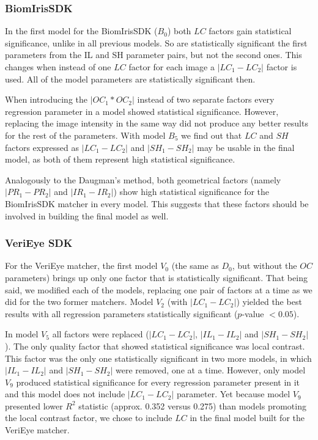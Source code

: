 \documentclass{article}
\begin{document}
\subsubsection{BiomIrisSDK}
In the first model for the BiomIrisSDK ($B_0$) both $LC$ factors gain statistical significance, unlike in all previous models. So are statistically significant the first parameters from the IL and SH parameter pairs, but not the second ones. This changes when instead of one $LC$ factor for each image a $|LC_1 - LC_2|$ factor is used. All of the model parameters are statistically significant then.

When introducing the $|OC_1 * OC_2|$ instead of two separate factors every regression parameter in a model showed statistical significance. However, replacing the image intensity in the same way did not produce any better results for the rest of the parameters. With model $B_5$ we find out that $LC$ and $SH$ factors expressed as $|LC_1 - LC_2|$ and $|SH_1 - SH_2|$ may be usable in the final model, as both of them represent high statistical significance.

Analogously to the Daugman's method, both geometrical factors (namely $|PR_1 - PR_2|$ and $|IR_1 - IR_2|$) show high statistical significance for the BiomIrisSDK matcher in every model. This suggests that these factors should be involved in building the final model as well.

\subsubsection{VeriEye SDK}
For the VeriEye matcher, the first model $V_0$ (the same as $D_0$, but without the $OC$ parameters) brings up only one factor that is statistically significant. That being said, we modified each of the models, replacing one pair of factors at a time as we did for the two former matchers. Model $V_2$ (with $|LC_1 - LC_2|$) yielded the best results with all regression parameters statistically significant ($p$-value $ < 0.05$).

In model $V_5$ all factors were replaced ($|LC_1 - LC_2|$, $|IL_1 - IL_2|$ and $|SH_1 - SH_2|$). The only quality factor that showed statistical significance was local contrast. This factor was the only one statistically significant in two more models, in which $|IL_1 - IL_2|$ and $|SH_1 - SH_2|$ were removed, one at a time. However, only model $V_9$ produced statistical significance for every regression parameter present in it and this model does not include $|LC_1 - LC_2|$ parameter. Yet because model $V_9$ presented lower $R^2$ statistic (approx. 0.352 versus 0.275) than models promoting the local contrast factor, we chose to include $LC$ in the final model built for the VeriEye matcher.
\end{document}
